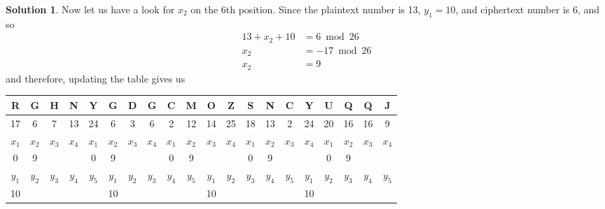\documentclass[11pt]{article}
\theoremstyle{definition}\newtheorem{definition}{Definition}
\theoremstyle{definition}\newtheorem{question}{Question}
\theoremstyle{definition}\newtheorem*{solution}{Solution}
\begin{document}
\begin{solution}
        Now let us have a look for $x_2$ on the 6th position. Since the plaintext number is 13, $y_1 = 10$, and ciphertext number is 6, and so
        \begin{align*}
            13 + x_2 + 10 &= 6 \bmod {26} \\
            x_2 &= -17 \bmod {26} \\
            x_2 &= 9
        \end{align*}
        and therefore, updating the table gives us
        \begin{center}
            \begin{tabular}{|cccccccccccccccccccc|}
                \hline
                R     & G     & H     & N                          & \multicolumn{1}{c|}{Y}     & G     & D     & G                          & C     & \multicolumn{1}{c|}{M}     & O     & Z                          & S     & N     & \multicolumn{1}{c|}{C}     & Y                          & U     & Q     & Q     & J     \\ \hline
                17    & 6     & 7     & 13                         & 24                         & 6     & 3     & 6                          & 2     & 12                         & 14    & 25                         & 18    & 13    & 2                          & 24                         & 20    & 16    & 16    & 9     \\ \hline
                $x_1$ & $x_2$ & $x_3$ & \multicolumn{1}{c|}{$x_4$} & $x_1$                      & $x_2$ & $x_3$ & \multicolumn{1}{c|}{$x_4$} & $x_1$ & $x_2$                      & $x_3$ & \multicolumn{1}{c|}{$x_4$} & $x_1$ & $x_2$ & $x_3$                      & \multicolumn{1}{c|}{$x_4$} & $x_1$ & $x_2$ & $x_3$ & $x_4$ \\ \hline
                0     & 9     &       & \multicolumn{1}{c|}{}      & 0                          & 9     &       & \multicolumn{1}{c|}{}      & 0     & 9                          &       & \multicolumn{1}{c|}{}      & 0     & 9     &                            & \multicolumn{1}{c|}{}      & 0     & 9     &       &       \\ \hline
                $y_1$ & $y_2$ & $y_3$ & $y_4$                      & \multicolumn{1}{c|}{$y_5$} & $y_1$ & $y_2$ & $y_3$                      & $y_4$ & \multicolumn{1}{c|}{$y_5$} & $y_1$ & $y_2$                      & $y_3$ & $y_4$ & \multicolumn{1}{c|}{$y_5$} & $y_1$                      & $y_2$ & $y_3$ & $y_4$ & $y_5$ \\ \hline
                10    &       &       &                            & \multicolumn{1}{c|}{}      & 10    &       &                            &       & \multicolumn{1}{c|}{}      & 10    &                            &       &       & \multicolumn{1}{c|}{}      & 10                         &       &       &       &       \\ \hline

\end{tabular}
\end{center}
\end{solution}
\end{document}

